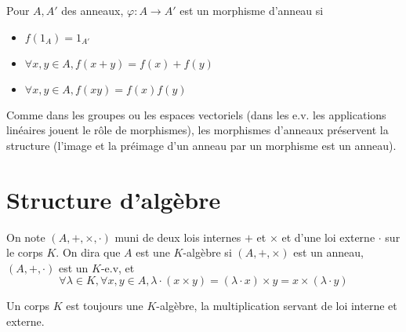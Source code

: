 \begin{dfn}
    Pour $A, A'$ des anneaux, $\varphi:A\to A'$ est un morphisme d'anneau si \begin{itemize}
        \item $f(1_A)=1_{A'}$
        \item $\forall x, y\in A, f(x+y)=f(x)+f(y)$
        \item $\forall x, y\in A, f(xy)=f(x)f(y)$
    \end{itemize}
\end{dfn}

Comme dans les groupes ou les espaces vectoriels (dans les e.v. les applications linéaires jouent le rôle de morphismes), les morphismes d'anneaux préservent la structure (l'image et la préimage d'un anneau par un morphisme est un anneau).

\section{Structure d'algèbre}

\begin{dfn}
    On note $(A, +, \times, \cdot)$ muni de deux lois internes $+$ et $\times$ et d'une loi externe $\cdot$ sur le corps $K$. On dira que $A$ est une $K$-algèbre si $(A, +,\times)$ est un anneau, $(A, +, \cdot)$ est un $K$-e.v, et \[
        \forall \lambda\in K, \forall x, y\in A, \lambda\cdot (x\times y)=(\lambda\cdot x)\times y=x\times (\lambda\cdot y)
    \]
\end{dfn}

\begin{rem}
    Un corps $K$ est toujours une $K$-algèbre, la multiplication servant de loi interne et externe.
\end{rem}
